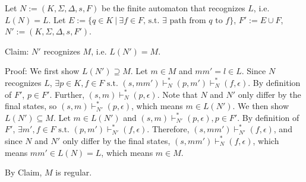 \documentclass[10pt,a4paper]{article}
\newcommand{\st}{\text{ s.t. }}
\begin{document}
Let $N:=(K,\Sigma,\Delta,s,F)$ be the finite automaton that recognizes $L$, i.e. $L(N)=L$. Let $E:=\{q\in K\:|\:\exists f\in F\text{, s.t. }\exists\text{ path from }q\text{ to }f\}$, $F':=E\cup F$, $N':=(K,\Sigma,\Delta,s,F')$.  \par
Claim: $N'$ recognizes $M$, i.e. $L(N')=M$.\par
Proof:\newline
We first show $L(N')\supseteq M$. Let $m\in M$ and $mm'=l\in L$. Since $N$ recognizes $L$, $\exists p\in K,f\in F\st (s,mm')\vdash^*_N(p,m')\vdash^*_N(f,\epsilon)$. By definition of $F'$, $p\in F'$. Further, $(s,m)\vdash^*_N(p,\epsilon)$. Note that $N$ and $N'$ only differ by the final states, so $(s,m)\vdash^*_{N'}(p,\epsilon)$, which means $m\in L(N')$.\newline
We then show $L(N')\subseteq M$. Let $m\in L(N')$ and $(s,m)\vdash^*_{N'}(p,\epsilon),p\in F'$. By definition of $F'$, $\exists m',f\in F\st (p,m')\vdash^*_{N'}(f,\epsilon)$. Therefore, $(s,mm')\vdash^*_{N'}(f,\epsilon)$, and since $N$ and $N'$ only differ by the final states, $(s,mm')\vdash^*_N(f,\epsilon)$, which means $mm'\in L(N)=L$, which means $m\in M$.

By Claim, $M$ is regular.
\end{document}
